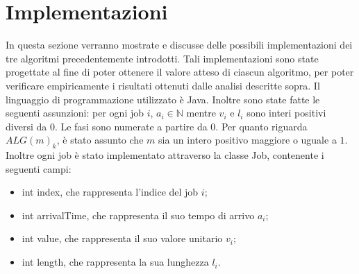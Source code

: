 \documentclass[12pt]{article}
\newcommand*{\N}{\mathbb{N}}
\begin{document}
\section{Implementazioni}
In questa sezione verranno mostrate e discusse delle possibili implementazioni  dei tre algoritmi precedentemente introdotti. Tali implementazioni sono state progettate al fine di poter ottenere il valore atteso di ciascun algoritmo, per poter verificare empiricamente i risultati ottenuti dalle analisi descritte sopra. Il linguaggio di programmazione utilizzato è Java. Inoltre sono state fatte le seguenti assunzioni: per ogni job $i$, $a_{i} \in \N$ mentre $v_{i}$ e $l_{i}$ sono interi positivi diversi da $0$. Le fasi sono numerate a partire da $0$. Per quanto riguarda $ALG(m)_{k}$, è stato assunto che $m$ sia un intero positivo maggiore o uguale a $1$. Inoltre ogni job è stato implementato attraverso la classe Job, contenente i seguenti campi:
\begin{itemize}
\item{int index, che rappresenta l’indice del job $i$;}
\item{int arrivalTime, che rappresenta il suo tempo di arrivo $a_{i}$;}
\item{int value, che rappresenta il suo valore unitario $v_{i}$;}
\item{int length, che rappresenta la sua lunghezza $l_{i}$.}
\end{itemize}
\end{document}
